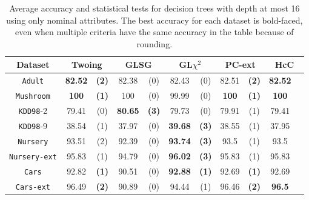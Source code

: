\begin{table}
\small
\caption{Average accuracy and statistical tests  for  decision trees 
with depth at most 16 using only nominal attributes. The best accuracy for each dataset is bold-faced, even when multiple criteria have the same accuracy in the table because of rounding.}
\centering
\begin{tabular}{c|cc|cc|cc|cc|cc} 
Dataset             & \multicolumn{2}{c|}{Twoing} &  \multicolumn{2}{c|}{GLSG}  & \multicolumn{2}{c|}{GL$\chi^2$} & \multicolumn{2}{c|}{PC-ext}& \multicolumn{2}{c}{HcC}\\ \hline
{\tt Adult}         &  {\bf 82.52} & {\bf (2)}    &  82.38       &  (0)         &  82.43       & (0)              & 82.51      & {\bf (2)}    & {\bf 82.52}&            \\
{\tt Mushroom}      &  {\bf 100}   & {\bf (1)}    &  100         &  (0)         &  99.99       & (0)              & {\bf 100 } & {\bf (1)}    & {\bf 100}  &            \\
{\tt KDD98}-2       &  79.41       & (0)          &  {\bf 80.65} & {\bf (3)}    &  79.73       & (0)              & 79.91      & (1)          & 79.41      &            \\
{\tt KDD98}-9       &  38.54       & (1)          &  37.97       & (0)          &  {\bf 39.68} & {\bf (3)}        & 38.55      & (1)          & 37.95      &            \\
{\tt Nursery}       &  93.51       & (2)          &  92.39       & (0)          &  {\bf 93.74} & {\bf (3)}        & 93.5       & (1)          & 93.5       &            \\
{\tt Nursery-ext}   &  95.83       & (1)          &  94.79       & (0)          &  {\bf 96.02} & {\bf (3)}        & 95.83      & (1)          & 95.83      &            \\
{\tt Cars}          &  92.82       & {\bf (1)}    &  90.51       & (0)          &  {\bf 92.88} & {\bf (1)}        & 92.69      & {\bf (1)}    & 92.69      &            \\
{\tt Cars-ext}      &  96.49       & {\bf (2)}    &  90.89       & (0)          &  94.44       & (1)              & 96.46      & {\bf (2)}    & {\bf 96.5} &            \\

\end{tabular}
\end{table}
